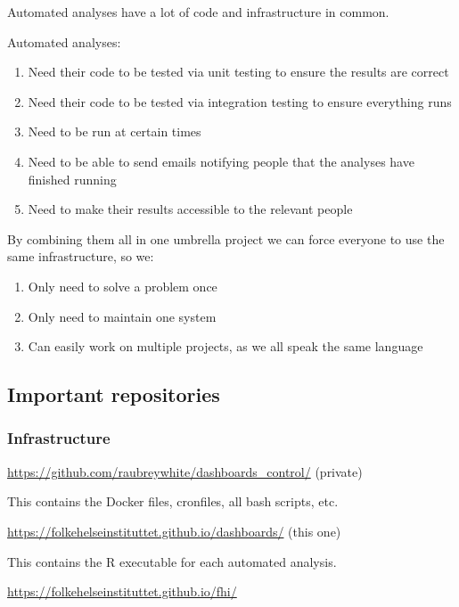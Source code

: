 \documentclass[12pt,]{article}
\providecommand{\tightlist}{%
  \setlength{\itemsep}{0pt}\setlength{\parskip}{0pt}}
\begin{document}
Automated analyses have a lot of code and infrastructure in common.

Automated analyses:

\begin{enumerate}
\def\labelenumi{\arabic{enumi}.}
\tightlist
\item
  Need their code to be tested via unit testing to ensure the results
  are correct
\item
  Need their code to be tested via integration testing to ensure
  everything runs
\item
  Need to be run at certain times
\item
  Need to be able to send emails notifying people that the analyses have
  finished running
\item
  Need to make their results accessible to the relevant people
\end{enumerate}

By combining them all in one umbrella project we can force everyone to
use the same infrastructure, so we:

\begin{enumerate}
\def\labelenumi{\arabic{enumi}.}
\tightlist
\item
  Only need to solve a problem once
\item
  Only need to maintain one system
\item
  Can easily work on multiple projects, as we all speak the same
  language
\end{enumerate}

\subsection{Important repositories}\label{important-repositories}

\subsubsection{Infrastructure}\label{infrastructure}

\url{https://github.com/raubreywhite/dashboards_control/} (private)

This contains the Docker files, cronfiles, all bash scripts, etc.

\url{https://folkehelseinstituttet.github.io/dashboards/} (this one)

This contains the R executable for each automated analysis.

\url{https://folkehelseinstituttet.github.io/fhi/}
\end{document}
